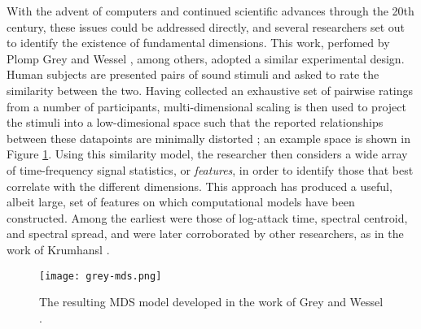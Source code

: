 With the advent of computers and continued scientific advances through the 20th century, these issues could be addressed directly, and several researchers set out to identify the existence of fundamental dimensions.
This work, perfomed by Plomp \cite{Plomp1976} Grey and Wessel \cite{Grey1979}, among others, adopted a similar experimental design.
Human subjects are presented pairs of sound stimuli and asked to rate the similarity between the two.
Having collected an exhaustive set of pairwise ratings from a number of participants, multi-dimensional scaling is then used to project the stimuli into a low-dimesional space such that the reported relationships between these datapoints are minimally distorted \cite{Grey1979}; an example space is shown in Figure \ref{fig:grey_mds}.
Using this similarity model, the researcher then considers a wide array of time-frequency signal statistics, or \emph{features}, in order to identify those that best correlate with the different dimensions.
This approach has produced a useful, albeit large, set of features on which computational models have been constructed.
Among the earliest were those of log-attack time, spectral centroid, and spectral spread, and were later corroborated by other researchers, as in the work of Krumhansl \cite{Krumhansl}.

\begin{figure}[t]
\centering
\texttt{[image: grey-mds.png]}
\caption{The resulting MDS model developed in the work of Grey and Wessel \cite{Grey1979}.}
\label{fig:grey_mds}
\end{figure}


